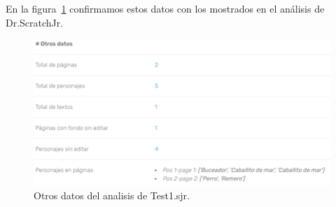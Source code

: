 \documentclass[a4paper, 12pt]{book}
\begin{document}
En la figura~\ref{fig:otros_datos_Test1} confirmamos estos datos con los mostrados en el análisis de Dr.ScratchJr.

\vspace{5mm}
\begin{figure}[H]
  \centering
  \includegraphics[width=15cm, keepaspectratio]{img/otros_datos_Test1.png}
  \caption{Otros datos del analisis de Test1.sjr.}
  \label{fig:otros_datos_Test1}
\end{figure}

\newpage
\end{document}

